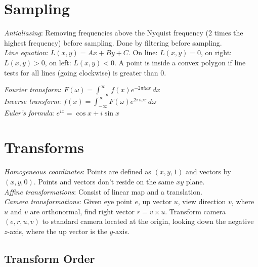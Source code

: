 \documentclass[10pt,landscape]{article}
\begin{document}
\raggedright
\footnotesize
\begin{multicols}{3}

\setlength{\premulticols}{1pt}
\setlength{\postmulticols}{1pt}
\setlength{\multicolsep}{1pt}
\setlength{\columnsep}{2pt}


\section{Sampling}

\textit{Antialiasing}: Removing frequencies above the Nyquist frequency (2 times the highest frequency) before sampling. Done by filtering before sampling. \\
\textit{Line equation}: $L(x, y) = Ax + By + C$. On line: $L(x, y) = 0$, on right: $L(x, y) > 0$, on left: $L(x, y) < 0$. A point is inside a convex polygon if line tests for all lines (going clockwise) is greater than 0.

\textit{Fourier transform}: $F(\omega) = \int_{-\infty}^{\infty} f(x) e^{-2\pi i \omega x} \,dx$ \\
\textit{Inverse transform}: $f(x) = \int_{-\infty}^{\infty} F(\omega) e^{2\pi i \omega x} \,d\omega$ \\
\textit{Euler's formula}: $e^{ix} = \cos x + i\sin x$


\section{Transforms}

\textit{Homogeneous coordinates}: Points are defined as $(x, y, 1)$ and vectors by $(x, y, 0)$. Points and vectors don't reside on the same $xy$ plane. \\
\textit{Affine transformations}: Consist of linear map and a translation. \\
\textit{Camera transformations}: Given eye point $e$, up vector $u$, view direction $v$, where $u$ and $v$ are orthonormal, find right vector $r = v \times u$. Transform camera $(e, r, u, v)$ to standard camera located at the origin, looking down the negative $z$-axis, where the up vector is the $y$-axis.

\subsection{Transform Order}


\end{multicols}
\end{document}
